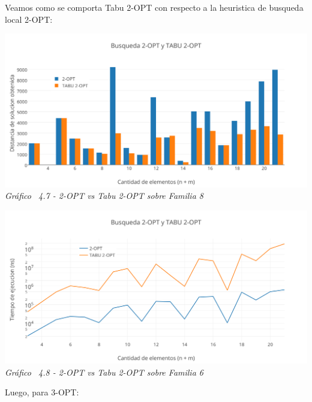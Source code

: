 Veamos como se comporta Tabu 2-OPT con respecto a la heuristica de busqueda local 2-OPT:

\vspace*{0.3cm} \vspace*{0.3cm}
  \begin{center}
 \includegraphics[scale=0.5]{./EJ4/comparativorandom2opt.png}\\
 {            \textit{Gráfico \ 4.7 - 2-OPT vs Tabu 2-OPT sobre Familia 8}}
  \end{center}
  \vspace*{0.3cm}

\vspace*{0.3cm} \vspace*{0.3cm}
  \begin{center}
 \includegraphics[scale=0.5]{./EJ4/medicionrandom2opt.png}\\
 {            \textit{Gráfico \ 4.8 - 2-OPT vs Tabu 2-OPT sobre Familia 6}}
  \end{center}
  \vspace*{0.3cm}

Luego, para 3-OPT:

